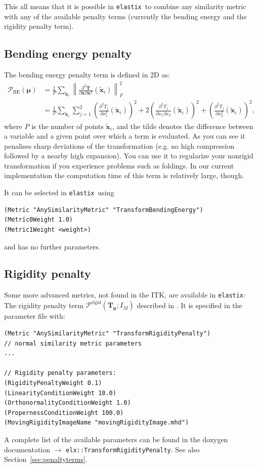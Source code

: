 \documentclass[]{report}
\newcommand{\elastix}{\texttt{elastix}}
\newcommand{\vx}{\bm{x}}
\newcommand{\vxt}[1][]{\bm{\widetilde x}_{#1}}
\newcommand{\vmu}{\bm{\mu}}
\newcommand{\vT}{\bm{T}}
\newcommand{\vTm}{\bm{T}_{\vmu}}
\begin{document}
This all means that it is possible in \elastix\ to combine any similarity
metric with any of the available penalty terms (currently the bending energy
and the rigidity penalty term).

\subsection{Bending energy penalty}\label{sec:advanced:be}

The bending energy penalty term is defined in 2D as:
\begin{align}
\mathcal{P}_{\mathrm{BE}}(\vmu) &= \frac{1}{P} \sum_{\vxt[i]}
\left\| \frac{\partial^2 \vT}{\partial \vx \partial \vx^T}(\vxt[i])
\right\|_F^2 \\
&= \frac{1}{P} \sum_{\vxt[i]} \sum_{j = 1}^2 \left( \frac{\partial^2
T_j}{\partial x_1^2}(\vxt[i]) \right)^2  + 2 \left( \frac{\partial^2
T_j}{\partial x_1 \partial x_2}(\vxt[i]) \right)^2 + \left(
\frac{\partial^2 T_j}{\partial x_2^2}(\vxt[i]) \right)^2,
\end{align}
where $P$ is the number of points $\vxt[i]$, and the tilde denotes
the difference between a variable and a given point over which a
term is evaluated. As you can see it penalises sharp deviations of
the transformation (e.g. no high compression followed by a nearby
high expansion). You can use it to regularize your nonrigid
transformation if you experience problems such as foldings. In our
current implementation the computation time of this term is
relatively large, though.

It can be selected in \elastix\ using \small
\begin{verbatim}
(Metric "AnySimilarityMetric" "TransformBendingEnergy")
(Metric0Weight 1.0)
(Metric1Weight <weight>)
\end{verbatim}
\normalsize and has no further parameters.

\subsection{Rigidity penalty}\label{sec:advanced:rp}

Some more advanced metrics, not found in the ITK, are available in
\elastix: The rigidity penalty term
$\mathcal{P}^{\mathrm{rigid}}(\vTm;I_M)$ described in
\cite{Staring07}. It is specified in the parameter file with: \small
\begin{verbatim}
(Metric "AnySimilarityMetric" "TransformRigidityPenalty")
// normal similarity metric parameters
...

// Rigidity penalty parameters:
(RigidityPenaltyWeight 0.1)
(LinearityConditionWeight 10.0)
(OrthonormalityConditionWeight 1.0)
(PropernessConditionWeight 100.0)
(MovingRigidityImageName "movingRigidityImage.mhd")
\end{verbatim}
\normalsize A complete list of the available parameters can be found in the
doxygen documentation $\rightarrow$ \linebreak
\texttt{elx::TransformRigidityPenalty}. See also
Section~\ref{sec:penaltyterms}.
\end{document}
